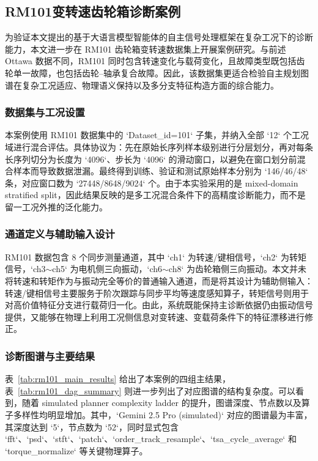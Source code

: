 \subsection{RM101变转速齿轮箱诊断案例}
\label{sec:rm101_case}

为验证本文提出的基于大语言模型智能体的自主信号处理框架在复杂工况下的诊断能力，本文进一步在 RM101 齿轮箱变转速数据集上开展案例研究。与前述 Ottawa 数据不同，RM101 同时包含转速变化与载荷变化，且故障类型既包括齿轮单一故障，也包括齿轮--轴承复合故障。因此，该数据集更适合检验自主规划图谱在复杂工况适应、物理语义保持以及多分支特征构造方面的综合能力。

\subsubsection{数据集与工况设置}

本案例使用 RM101 数据集中的 `Dataset\_id=101` 子集，并纳入全部 `12` 个工况域进行混合评估。具体协议为：先在原始长序列样本级别进行分层划分，再对每条长序列切分为长度为 `4096`、步长为 `4096` 的滑动窗口，以避免在窗口划分前混合样本而导致数据泄漏。最终得到训练、验证和测试原始样本分别为 `146/46/48` 条，对应窗口数为 `27448/8648/9024` 个。由于本实验采用的是 mixed-domain stratified split，因此结果反映的是多工况混合条件下的高精度诊断能力，而不是留一工况外推的泛化能力。

\subsubsection{通道定义与辅助输入设计}

RM101 数据包含 8 个同步测量通道，其中 `ch1` 为转速/键相信号，`ch2` 为转矩信号，`ch3$\sim$ch5` 为电机侧三向振动，`ch6$\sim$ch8` 为齿轮箱侧三向振动。本文并未将转速和转矩作为与振动完全等价的普通输入通道，而是将其设计为辅助侧输入：转速/键相信号主要服务于阶次跟踪与同步平均等速度感知算子，转矩信号则用于对高价值特征分支进行载荷归一化。由此，系统既能保持主诊断依据仍由振动信号提供，又能够在物理上利用工况侧信息对变转速、变载荷条件下的特征漂移进行修正。

\subsubsection{诊断图谱与主要结果}

表~\ref{tab:rm101_main_results} 给出了本案例的四组主结果，表~\ref{tab:rm101_dag_summary} 则进一步列出了对应图谱的结构复杂度。可以看到，随着 simulated planner complexity ladder 的提升，图谱深度、节点数以及算子多样性均明显增加。其中，`Gemini 2.5 Pro (simulated)` 对应的图谱最为丰富，其深度达到 `5`，节点数为 `52`，同时显式包含 `fft`、`psd`、`stft`、`patch`、`order\_track\_resample`、`tsa\_cycle\_average` 和 `torque\_normalize` 等关键物理算子。

